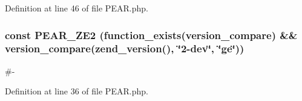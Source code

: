 Definition at line 46 of file P\+E\+A\+R.\+php.

\subsubsection[{\texorpdfstring{P\+E\+A\+R\+\_\+\+Z\+E2}{PEAR_ZE2}}]{\setlength{\rightskip}{0pt plus 5cm}const P\+E\+A\+R\+\_\+\+Z\+E2 (function\+\_\+exists(\textquotesingle{}version\+\_\+compare\textquotesingle{}) \&\& version\+\_\+compare(zend\+\_\+version(), \char`\"{}2-\/dev\char`\"{}, \char`\"{}ge\char`\"{}))}\hypertarget{PEAR_8php_a16b6fef5a6547779f3d9d6e1b7c5c2b5}{}\label{PEAR_8php_a16b6fef5a6547779f3d9d6e1b7c5c2b5}
\#-\/ 

Definition at line 36 of file P\+E\+A\+R.\+php.

